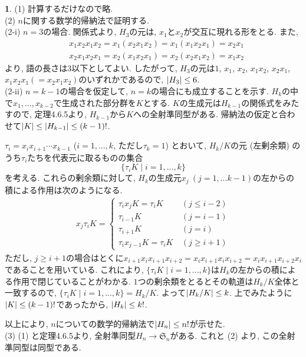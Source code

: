\documentclass{article}
\theoremstyle{definition}
\newtheorem{ans}{}
\numberwithin{ans}{subsection}
\DeclarePairedDelimiter{\order}{\lvert}{\rvert}
\begin{document}
\begin{ans}
  (1) 計算するだけなので略.\\
  (2) $n$に関する数学的帰納法で証明する.\\
  (2-i) $n = 3$の場合.
  関係式より, $H_3$の元は, $x_1$と$x_2$が交互に現れる形をとる.
  また,
  \begin{align*}
    &x_1x_2x_1x_2 = x_1(x_2x_1x_2) = x_1(x_1x_2x_1) = x_2x_1 \\
    &x_2x_1x_2x_1 = x_2(x_1x_2x_1) = x_2(x_2x_1x_2) = x_1x_2
  \end{align*}
  より, 語の長さは$3$以下としてよい.
  したがって, $H_3$の元は$1$, $x_1$, $x_2$, $x_1x_2$, $x_2x_1$, $x_1x_2x_1 (=x_2x_1x_2)$のいずれかであるので,
  $\order{H_3} \le 6$.\\
  (2-ii) $n = k - 1$の場合を仮定して, $n = k$の場合にも成立することを示す.
  $H_{k}$の中で$x_1,..., x_{k-2}$で生成された部分群を$K$とする.
  $K$の生成元は$H_{k-1}$の関係式をみたすので,
  定理4.6.5より, $H_{k-1}$から$K$への全射準同型がある.
  帰納法の仮定と合わせて$\order{K} \le \order{H_{k-1}} \le (k-1)!$.

  $\tau_i = x_ix_{i+1} \cdots x_{k-1}$ ($i = 1,...,k$, ただし$\tau_k = 1$)
  とおいて, $H_k/K$の元 (左剰余類) のうち$\tau_i$たちを代表元に取るものの集合
  \[
    \{ \tau_iK \mid i = 1,...,k \}
  \]
  を考える. これらの剰余類に対して, $H_k$の生成元$x_j\ (j = 1,...k-1)$の左からの積による作用は次のようになる.
  \begin{align*}
    x_j\tau_iK = \begin{cases*}
      \tau_ix_jK = \tau_iK\ &(j \le i - 2) \\
      \tau_{i-1}K\ &(j = i - 1) \\
      \tau_{i+1}K\ &(j = i) \\
      \tau_ix_{j-1}K = \tau_iK\ &(j \ge i + 1)
    \end{cases*}
  \end{align*}
  ただし, $j \ge i + 1$の場合はとくに$x_{i+1}x_ix_{i+1}x_{i+2} = x_ix_{i+1}x_ix_{i+2} = x_ix_{i+1}x_{i+2}x_i$
  であることを用いている.
  これにより, $\{ \tau_iK \mid i = 1,...,k \}$は$H_k$の左からの積による作用で閉じていることがわかる.
  $1$つの剰余類をとるとその軌道は$H_k/K$全体と一致するので,
  $\{ \tau_iK \mid i = 1,...,k \} = H_k/K$.
  よって$\order{H_k/K} \le k$.
  上でみたように$\order{K} \le (k-1)!$であったから, $\order{H_k} \le k!$.

  以上により, $n$についての数学的帰納法で$\order{H_n} \le n!$が示せた.\\
  (3) (1) と定理4.6.5より, 全射準同型$H_n \rightarrow \mathfrak{S}_n$がある.
  これと (2) より, この全射準同型は同型である.
\end{ans}
\end{document}
